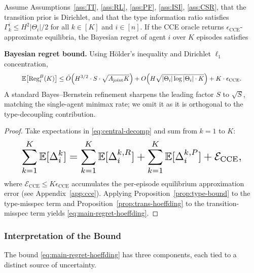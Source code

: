 \begin{theorem}
\label{thm:main-regret}
Assume Assumptions~\ref{ass:TI}, \ref{ass:RL}, \ref{ass:PF}, \ref{ass:ISI}, \ref{ass:CSR}, that the transition prior is Dirichlet, and that the type information ratio satisfies $\Gamma_k^i \leq H^2 |\Theta_i|/2$ for all $k \in [K]$ and $i \in [n]$. If the CCE oracle returns $\epsilon_{\mathrm{CCE}}$-approximate equilibria, the Bayesian regret of agent $i$ over $K$ episodes satisfies

\textbf{Bayesian regret bound.} Using H\"older's inequality and Dirichlet $\ell_1$ concentration,
\begin{equation}\label{eq:main-regret-hoeffding}\resizebox{0.9\linewidth}{!}{$\displaystyle \mathbb{E}\big[\mathrm{Reg}_i^B(K)\big] \leq \tilde{O}\Big(H^{3/2} \cdot S \cdot \sqrt{A_{\mathrm{joint}} K}\Big) + O\Big(H \sqrt{|\Theta_i| \log|\Theta_i| \cdot K}\Big) + K \cdot \epsilon_{\mathrm{CCE}}. $}\end{equation}
A standard Bayes--Bernstein refinement \citep{lu2019information,azar2017minimax} sharpens the leading factor $S$ to $\sqrt{S}$, matching the single-agent minimax rate; we omit it as it is orthogonal to the type-decoupling contribution.
\end{theorem}

\begin{proof}
Take expectations in \eqref{eq:central-decomp} and sum from $k=1$ to $K$:
\begin{equation}\resizebox{0.9\linewidth}{!}{$\displaystyle \sum_{k=1}^K \mathbb{E}[\Delta_i^k] = \sum_{k=1}^K \mathbb{E}[\Delta_i^{k,R}] + \sum_{k=1}^K \mathbb{E}[\Delta_i^{k,P}] + \mathcal{E}_{\mathrm{CCE}}, $}\end{equation}
where $\mathcal{E}_{\mathrm{CCE}} \leq K \epsilon_{\mathrm{CCE}}$ accumulates the per-episode equilibrium approximation error (see Appendix~\ref{app:cce}). Applying Proposition~\ref{prop:type-bound} to the type-misspec term and Proposition~\ref{prop:trans-hoeffding} to the transition-misspec term yields \eqref{eq:main-regret-hoeffding}.
\end{proof}

\subsubsection{Interpretation of the Bound}

The bound \eqref{eq:main-regret-hoeffding} has three components, each tied to a distinct source of uncertainty.

